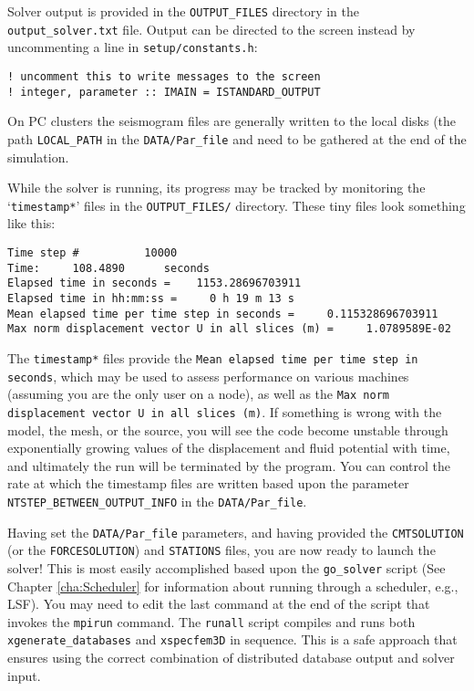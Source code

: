 Solver output is provided in the \texttt{OUTPUT\_FILES} directory
in the \texttt{output\_solver.txt} file. Output can be directed to
the screen instead by uncommenting a line in \texttt{setup/constants.h}:
\begin{verbatim}
! uncomment this to write messages to the screen
! integer, parameter :: IMAIN = ISTANDARD_OUTPUT
\end{verbatim}
On PC clusters the seismogram files are generally written to the local
disks (the path \texttt{LOCAL\_PATH} in the \texttt{DATA/Par\_file} and
need to be gathered at the end of the simulation.

While the solver is running, its progress may be tracked by monitoring
the `\texttt{\small timestamp{*}}' files in the \texttt{\small OUTPUT\_FILES/} directory. These tiny
files look something like this:
{\small
\begin{verbatim}
Time step #          10000
Time:     108.4890      seconds
Elapsed time in seconds =    1153.28696703911
Elapsed time in hh:mm:ss =     0 h 19 m 13 s
Mean elapsed time per time step in seconds =     0.115328696703911
Max norm displacement vector U in all slices (m) =     1.0789589E-02
\end{verbatim}
}
The \texttt{\small timestamp{*}} files provide the
\texttt{\small Mean elapsed time per time step in seconds}, which may be used
to assess performance on various machines (assuming you are the only
user on a node), as well as the
\texttt{\small Max norm displacement vector U in all slices~(m)}.
If something is wrong with the
model, the mesh, or the source, you will see the code become unstable
through exponentially growing values of the displacement and fluid
potential with time, and ultimately the run will be terminated by
the program. You can control the rate at which the timestamp files
are written based upon the parameter
\texttt{\small NTSTEP\_BETWEEN\_OUTPUT\_INFO}
in the \texttt{DATA/Par\_file}.

Having set the \texttt{DATA/Par\_file} parameters, and having provided
the \texttt{CMTSOLUTION} (or the \texttt{FORCESOLUTION}) and \texttt{STATIONS}
files, you are now ready to launch the solver! This is most easily
accomplished based upon the \texttt{go\_solver} script (See Chapter
\ref{cha:Scheduler} for information about running through a scheduler,
e.g., LSF). You may need to edit the last command at the end of the
script that invokes the \texttt{mpirun} command. The \texttt{runall}
script compiles and runs both \texttt{xgenerate\_databases} and \texttt{xspecfem3D}
in sequence. This is a safe approach that ensures using the correct
combination of distributed database output and solver input.

